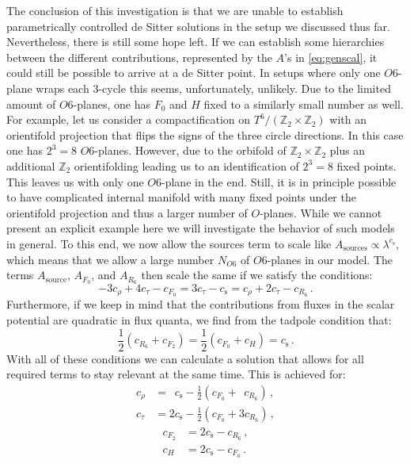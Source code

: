 \documentclass[a4paper,12pt]{report}
\newcommand{\be}{\begin{equation}}
\newcommand{\ee}{\end{equation}}
\newcommand{\bea}{\begin{equation}\begin{aligned}}
\newcommand{\eea}{\end{aligned}\end{equation}}
\begin{document}
The conclusion of this investigation is that we are unable to establish parametrically controlled de Sitter solutions in the setup we discussed thus far. Nevertheless, there is still some hope left. If we can establish some hierarchies between the different contributions, represented by the $A$'s in \eqref{eq:genscal}, it could still be possible to arrive at a de Sitter point. In setups where only one $O6$-plane wraps each 3-cycle \cite{Danielsson:2011au} this seems, unfortunately, unlikely. Due to the limited amount of $O6$-planes, one has $F_0$ and $H$ fixed to a similarly small number as well. For example, let us consider a compactification on $T^ 6/(\mathbb{Z}_2 \times \mathbb{Z}_2)$ with an orientifold projection that flips the signs of the three circle directions. In this case one has $2^ 3 = 8$ $O6$-planes. However, due to the orbifold of $\mathbb{Z}_2 \times \mathbb{Z}_2$ plus an additional $\mathbb{Z}_2$ orientifolding leading us to an identification of $2^ 3 = 8$ fixed points. This leaves us with only one $O6$-plane in the end. Still, it is in principle possible to have complicated internal manifold with many fixed points under the orientifold projection and thus a larger number of $O$-planes. While we cannot present an explicit example here we will investigate the behavior of such models in general. To this end, we now allow the sources term to scale like $A_{\text{sources}} \propto \lambda^ {c_\text{s}}$, which means that we allow a large number $N_{O6}$ of $O6$-planes in our model. The terms $A_{\text{source}}$, $A_{F_0}$, and $A_{R_6}$ then scale the same if we satisfy the conditions:
\be 
-3 c_\rho + 4 c_\tau -c_{F_0} = 3 c_\tau - c_{\text{s}} = c_\rho + 2 c_\tau -c_{R_6}\,.
\ee
Furthermore, if we keep in mind that the contributions from fluxes in the scalar potential are quadratic in flux quanta, we find from the tadpole condition that:
\be 
\frac{1}{2} \left( c_{R_6} + c_{F_2} \right) = \frac{1}{2} \left( c_{F_0} + c_H \right) = c_{\text{s}}\,.
\ee
With all of these conditions we can calculate a solution that allows for all required terms to stay relevant at the same time. This is achieved for:
\bea 
c_\rho &= \hspace{6pt} c_{\text{s}} - \frac{1}{2} \left( c_{F_0} + \;\, c_{R_6} \right)\,,\\
c_\tau &= 2 c_{\text{s}} - \frac{1}{2} \left(c_{F_0} + 3 c_{R_6} \right)\,,
\eea
\begin{equation*}
     \begin{aligned}
c_{F_2} &= 2 c_{\text{s}} - c_{R_6}\,,\\
c_{H} &= 2 c_{\text{s}} - c_{F_0}\,.
     \end{aligned}
\end{equation*}
\end{document}
